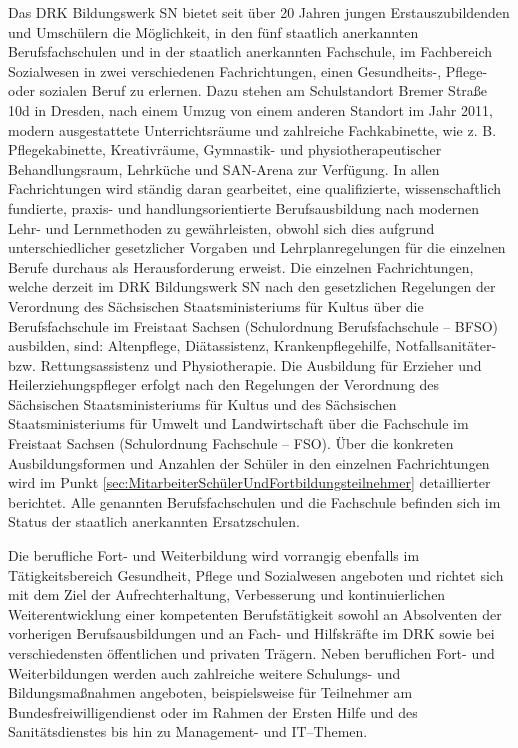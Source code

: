 Das DRK Bildungswerk SN bietet seit über 20 Jahren jungen Erstauszubildenden und  Umschülern die Möglichkeit, in den fünf staatlich anerkannten Berufsfachschulen und in der staatlich anerkannten Fachschule, im Fachbereich Sozialwesen in zwei verschiedenen Fachrichtungen, einen Gesundheits-, Pflege- oder sozialen Beruf zu erlernen. Dazu stehen am Schulstandort Bremer Straße 10d in Dresden, nach einem Umzug von einem anderen Standort im Jahr 2011, modern ausgestattete Unterrichtsräume und zahlreiche Fachkabinette, wie z. B. Pflegekabinette, Kreativräume, Gymnastik- und physiotherapeutischer Behandlungsraum, Lehrküche und SAN-Arena zur Verfügung. In allen Fachrichtungen wird ständig daran gearbeitet, eine qualifizierte, wissenschaftlich fundierte, praxis- und handlungsorientierte Berufsausbildung nach modernen Lehr- und Lernmethoden zu gewährleisten, obwohl sich dies aufgrund unterschiedlicher gesetzlicher Vorgaben und Lehrplanregelungen für die einzelnen Berufe durchaus als Herausforderung erweist. Die einzelnen Fachrichtungen, welche derzeit im DRK Bildungswerk SN nach den gesetzlichen Regelungen der Verordnung des Sächsischen Staatsministeriums für Kultus über die Berufsfachschule im Freistaat Sachsen (Schulordnung Berufsfachschule -- BFSO) ausbilden, sind: Altenpflege, Diätassistenz, Krankenpflegehilfe, Notfallsanitäter- bzw. Rettungsassistenz und Physiotherapie. Die Ausbildung für Erzieher und Heilerziehungspfleger erfolgt nach den Regelungen der Verordnung des Sächsischen Staatsministeriums für Kultus und des Sächsischen Staatsministeriums für Umwelt und Landwirtschaft über die Fachschule im Freistaat Sachsen (Schulordnung Fachschule – FSO). Über die konkreten Ausbildungsformen und Anzahlen der Schüler in den einzelnen Fachrichtungen wird im Punkt \ref{sec:MitarbeiterSchülerUndFortbildungsteilnehmer} detaillierter berichtet. Alle genannten Berufsfachschulen und die Fachschule befinden sich im Status der staatlich anerkannten Ersatzschulen.

Die berufliche Fort- und Weiterbildung wird vorrangig ebenfalls im Tätigkeitsbereich Gesundheit, Pflege und Sozialwesen angeboten und richtet sich mit dem Ziel der Aufrechterhaltung, Verbesserung und kontinuierlichen Weiterentwicklung einer kompetenten Berufstätigkeit sowohl an Absolventen der vorherigen Berufsausbildungen und an Fach- und Hilfskräfte im DRK sowie bei verschiedensten öffentlichen und privaten Trägern. Neben beruflichen Fort- und Weiterbildungen werden auch zahlreiche weitere Schulungs- und Bildungsmaßnahmen angeboten, beispielsweise für Teilnehmer am Bundesfreiwilligendienst oder im Rahmen der Ersten Hilfe und des Sanitätsdienstes bis hin zu Management- und IT--Themen. 

